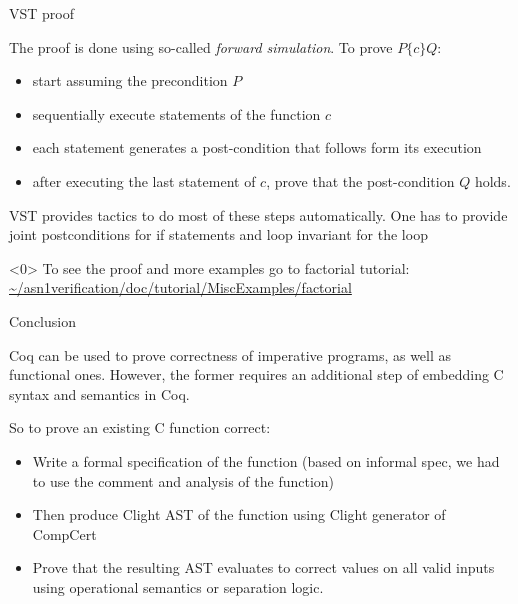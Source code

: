 \documentclass[10pt,usenames,dvipsnames,landscape]{beamer}
\begin{document}
\begin{frame}[fragile]{VST proof}

The proof is done using so-called \textit{forward simulation}. To prove $P \{c\} Q$:
\begin{itemize}
    \item start assuming the precondition $P$ 
    \item sequentially execute statements of the function $c$
    \item each statement generates a post-condition that follows form its execution
    \item after executing the last statement of $c$, prove that the post-condition $Q$ holds. 
\end{itemize}{}

VST provides tactics to do most of these steps automatically. One has to provide joint postconditions for if statements and loop invariant for the loop
    
\end{frame}
  
    
    \begin{frame}<0>
      To see the proof and more examples go to factorial tutorial: \url{~/asn1verification/doc/tutorial/MiscExamples/factorial}
    \end{frame}

    \begin{frame}{Conclusion}

      Coq can be used to prove correctness of imperative programs, as well as functional ones. However, the former requires an additional step of embedding C syntax and semantics in Coq. 
      
      So to prove an existing C function correct:
      \begin{itemize}
          \item  Write a formal specification of the function (based on informal spec, we had to use the comment and analysis of the function)
          \item Then produce Clight AST of the function using Clight generator of CompCert
          \item Prove that the resulting AST evaluates to correct values on all valid inputs using operational semantics or separation logic. 
            \end{itemize}
            
      \end{frame}
\end{document}
